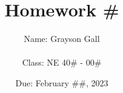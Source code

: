 \documentclass{article}
\title{\textbf{Homework \#}}
\author{
    Name: Grayson Gall 
    \\ \\
    Class: NE 40\# - 00\#
}
\date{Due: February \#\#, 2023}
\begin{document}
\maketitle

\newpage
\section{}


\end{document}
